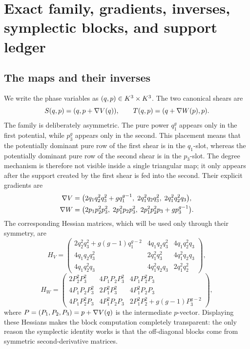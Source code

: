 \documentclass[11pt]{article}
\theoremstyle{remark}
\numberwithin{equation}{section}
\begin{document}
\section{Exact family, gradients, inverses, symplectic blocks, and support ledger}\label{sec:setup}

\subsection{The maps and their inverses}\label{sec:maps}

We write the phase variables as \((q,p)\in K^3\times K^3\).  The two
canonical shears are
\[
S(q,p)=(q,p+\nabla V(q)),\qquad
T(q,p)=(q+\nabla W(p),p).
\]
The family is deliberately asymmetric.  The pure power \(q_1^g\) appears only
in the first potential, while \(p_3^g\) appears only in the second.  This
placement means that the potentially dominant pure row of the first shear is in
the \(q_1\)-slot, whereas the potentially dominant pure row of the second shear
is in the \(p_3\)-slot.  The degree mechanism is therefore not visible inside a
single triangular map; it only appears after the support created by the first
shear is fed into the second.
Their explicit gradients are
\begin{align}
\nabla V
&=
\bigl(2q_1q_2^2q_3^2+gq_1^{g-1},\;2q_1^2q_2q_3^2,\;2q_1^2q_2^2q_3\bigr),\\
\nabla W
&=
\bigl(2p_1p_2^2p_3^2,\;2p_1^2p_2p_3^2,\;2p_1^2p_2^2p_3+gp_3^{g-1}\bigr).
\end{align}
The corresponding Hessian matrices, which will be used only through their
symmetry, are
\[
H_V=
\begin{pmatrix}
2q_2^2q_3^2+g(g-1)q_1^{g-2} & 4q_1q_2q_3^2 & 4q_1q_2^2q_3\\
4q_1q_2q_3^2 & 2q_1^2q_3^2 & 4q_1^2q_2q_3\\
4q_1q_2^2q_3 & 4q_1^2q_2q_3 & 2q_1^2q_2^2
\end{pmatrix},
\]
\[
H_W=
\begin{pmatrix}
2P_2^2P_3^2 & 4P_1P_2P_3^2 & 4P_1P_2^2P_3\\
4P_1P_2P_3^2 & 2P_1^2P_3^2 & 4P_1^2P_2P_3\\
4P_1P_2^2P_3 & 4P_1^2P_2P_3 & 2P_1^2P_2^2+g(g-1)P_3^{g-2}
\end{pmatrix},
\]
where \(P=(P_1,P_2,P_3)=p+\nabla V(q)\) is the intermediate \(p\)-vector.
Displaying these Hessians makes the block computation completely transparent:
the only reason the symplectic identity works is that the off-diagonal blocks
come from symmetric second-derivative matrices.
\end{document}
